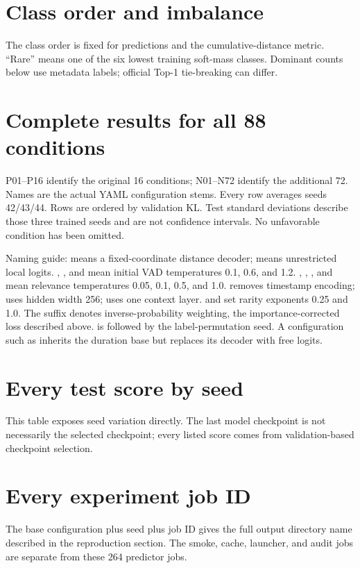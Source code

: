 \documentclass[11pt,a4paper]{article}
\newcommand{\tbl}[1]{}
\begin{document}
\appendix
\clearpage
\section{Class order and imbalance}\label{app:classes}
The class order is fixed for predictions and the cumulative-distance metric. ``Rare'' means one of the six lowest training soft-mass classes. Dominant counts below use metadata labels; official Top-1 tie-breaking can differ.
\tbl{classes}

\clearpage
\section{Complete results for all 88 conditions}\label{app:full}
P01--P16 identify the original 16 conditions; N01--N72 identify the additional 72. Names are the actual YAML configuration stems. Every row averages seeds 42/43/44. Rows are ordered by validation KL. Test standard deviations describe those three trained seeds and are not confidence intervals. No unfavorable condition has been omitted.

Naming guide:  means a fixed-coordinate distance decoder;  means unrestricted local logits. , , and  mean initial VAD temperatures 0.1, 0.6, and 1.2. , , , and  mean relevance temperatures 0.05, 0.1, 0.5, and 1.0.  removes timestamp encoding;  uses hidden width 256;  uses one context layer.  and  set rarity exponents 0.25 and 1.0. The suffix  denotes inverse-probability weighting, the importance-corrected loss described above.  is followed by the label-permutation seed. A configuration such as  inherits the duration base but replaces its decoder with free logits.
\tbl{all_conditions}

\clearpage
\section{Every test score by seed}
This table exposes seed variation directly. The last model checkpoint is not necessarily the selected checkpoint; every listed score comes from validation-based checkpoint selection.
\tbl{seeds}

\clearpage
\section{Every experiment job ID}
The base configuration plus seed plus job ID gives the full output directory name described in the reproduction section. The smoke, cache, launcher, and audit jobs are separate from these 264 predictor jobs.
\tbl{jobs}
\end{document}
